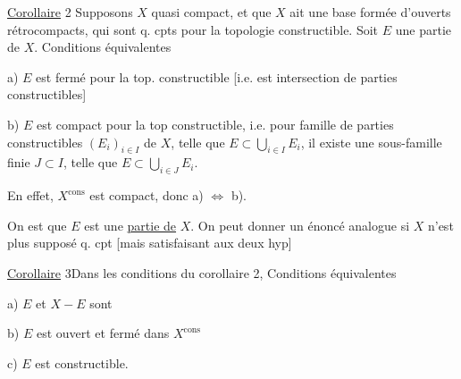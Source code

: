 \uline{Corollaire} 2\quad {} Supposons $X$  quasi compact,  et que  $X$ ait une base formée d'ouverts  rétrocompacts, qui sont q. cpts pour la topologie constructible. Soit $E$ une partie de $X$. Conditions équivalentes

a) $E$ est fermé pour la top. constructible [i.e. est intersection  de parties constructibles]

b) $E$ est compact pour la top constructible, i.e. pour \unsure{$\forall$} famille de parties constructibles $(E_i)_{i\in I}$ de $X$, telle que $E\subset\bigcup_{i\in I}E_i$, il existe une sous-famille finie $J\subset I$, telle que $E\subset\bigcup_{i\in J}E_i$.


 En effet, $X^{\mathrm{cons}}$ est compact, donc a) $\Longleftrightarrow$ b).

On est  que  $E$ est une \uline{partie  de} $X$. On peut donner un énoncé analogue si $X$ n'est plus supposé q. cpt [mais satisfaisant aux deux hyp]


\uline{Corollaire} 3\quad Dans les conditions du corollaire 2, Conditions équivalentes

a) $E$ et $X-E$ sont 

b) $E$ est  ouvert et fermé dans $X^{\mathrm{cons}}$

c) $E$ est constructible.

